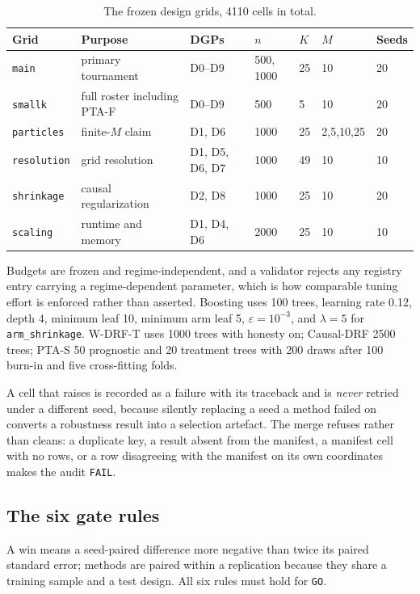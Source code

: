 \documentclass[11pt,a4paper]{article}
\theoremstyle{definition}
\theoremstyle{remark}
\begin{document}
\begin{table}[htbp]
\centering
\caption{The frozen design grids, 4110 cells in total.}
\label{tab:grids}
\small
\begin{tabular}{@{}lllllll@{}}
\toprule
Grid & Purpose & DGPs & $n$ & $K$ & $M$ & Seeds \\
\midrule
\texttt{main} & primary tournament & D0--D9 & 500, 1000 & 25 & 10 & 20 \\
\texttt{smallk} & full roster including PTA-F & D0--D9 & 500 & 5 & 10 & 20 \\
\texttt{particles} & finite-$M$ claim & D1, D6 & 1000 & 25 & 2,5,10,25 & 20 \\
\texttt{resolution} & grid resolution & D1, D5, D6, D7 & 1000 & 49 & 10 & 10 \\
\texttt{shrinkage} & causal regularization & D2, D8 & 1000 & 25 & 10 & 20 \\
\texttt{scaling} & runtime and memory & D1, D4, D6 & 2000 & 25 & 10 & 10 \\
\bottomrule
\end{tabular}
\end{table}

Budgets are frozen and regime-independent, and a validator rejects any registry
entry carrying a regime-dependent parameter, which is how comparable tuning
effort is enforced rather than asserted. Boosting uses 100 trees, learning rate
0.12, depth 4, minimum leaf 10, minimum arm leaf 5, $\varepsilon = 10^{-3}$, and
$\lambda = 5$ for \texttt{arm\_shrinkage}. W-DRF-T uses 1000 trees with honesty
on; Causal-DRF 2500 trees; PTA-S 50 prognostic and 20 treatment trees with 200
draws after 100 burn-in and five cross-fitting folds.

A cell that raises is recorded as a failure with its traceback and is
\emph{never} retried under a different seed, because silently replacing a seed a
method failed on converts a robustness result into a selection artefact. The
merge refuses rather than cleans: a duplicate key, a result absent from the
manifest, a manifest cell with no rows, or a row disagreeing with the manifest on
its own coordinates makes the audit \texttt{FAIL}.

\subsection{The six gate rules}

A win means a seed-paired difference more negative than twice its paired standard
error; methods are paired within a replication because they share a training
sample and a test design. All six rules must hold for \texttt{GO}.
\end{document}
